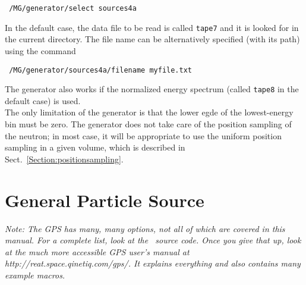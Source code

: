 \begin{lstlisting}
 /MG/generator/select sources4a
\end{lstlisting}
In the default case, the data file to be read is called \texttt{tape7} and it is 
looked for in the current directory. The file name can be alternatively specified 
(with its path) using the command 
\begin{lstlisting}
 /MG/generator/sources4a/filename myfile.txt
\end{lstlisting}
The generator also works if the normalized energy spectrum (called 
\texttt{tape8} in the default case) is used.\\ 
The only limitation of the generator is that the lower egde of the lowest-energy 
bin must be zero. The generator does not take care of the position sampling of the 
neutron; in most case, it will be appropriate to use the uniform position sampling in 
a given volume, which is described in Sect.~\ref{Section:positionsampling}. 

\section{General Particle Source}\label{sec:GPS}
{\em Note:  The GPS has many, many options, not all of which are covered in this
manual.  For a complete list, look at the \geant \ source code.  Once you give
that up, look at the much more accessible GPS user's manual at
\hbox{http://reat.space.qinetiq.com/gps/}.  It explains everything and also contains many example
macros.} 

